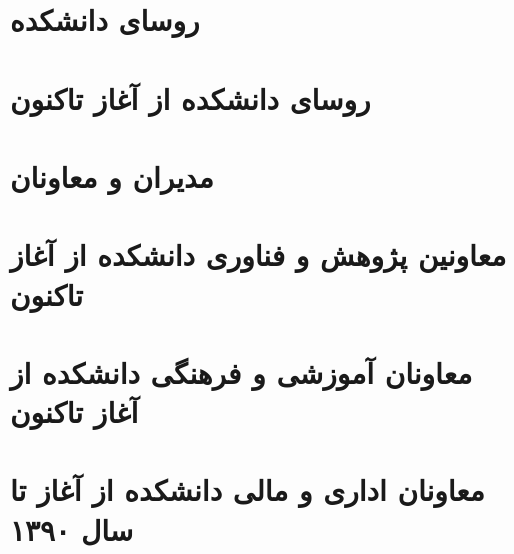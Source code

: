 \documentclass[
  letterpaper,
  DIV=11,
  numbers=noendperiod]{scrreprt}
\begin{document}
\chapter{روسای
دانشکده}\label{ux631ux648ux633ux627ux6cc-ux62fux627ux646ux634ux6a9ux62fux647}


\chapter{روسای دانشکده از آغاز
تاکنون}\label{ux631ux648ux633ux627ux6cc-ux62fux627ux646ux634ux6a9ux62fux647-ux627ux632-ux622ux63aux627ux632-ux62aux627ux6a9ux646ux648ux646}


\chapter{مدیران و
معاونان}\label{ux645ux62fux6ccux631ux627ux646-ux648-ux645ux639ux627ux648ux646ux627ux646}


\chapter{معاونین پژوهش و فناوری دانشکده از آغاز
تاکنون}\label{ux645ux639ux627ux648ux646ux6ccux646-ux67eux698ux648ux647ux634-ux648-ux641ux646ux627ux648ux631ux6cc-ux62fux627ux646ux634ux6a9ux62fux647-ux627ux632-ux622ux63aux627ux632-ux62aux627ux6a9ux646ux648ux646}


\chapter{معاونان آموزشی و فرهنگی دانشکده از آغاز
تاکنون}\label{ux645ux639ux627ux648ux646ux627ux646-ux622ux645ux648ux632ux634ux6cc-ux648-ux641ux631ux647ux646ux6afux6cc-ux62fux627ux646ux634ux6a9ux62fux647-ux627ux632-ux622ux63aux627ux632-ux62aux627ux6a9ux646ux648ux646}


\chapter{معاونان اداری و مالی دانشکده از آغاز تا سال
۱۳۹۰}\label{ux645ux639ux627ux648ux646ux627ux646-ux627ux62fux627ux631ux6cc-ux648-ux645ux627ux644ux6cc-ux62fux627ux646ux634ux6a9ux62fux647-ux627ux632-ux622ux63aux627ux632-ux62aux627-ux633ux627ux644-ux6f1ux6f3ux6f9ux6f0}
\end{document}

